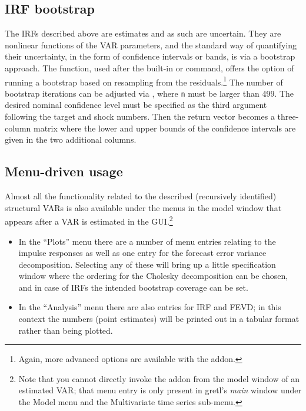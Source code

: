\subsection{IRF bootstrap}

The IRFs described above are estimates and as such are uncertain.  They
are nonlinear functions of the VAR parameters, and the standard way of
quantifying their uncertainty, in the form of confidence intervals or
bands, is via a bootstrap approach. The  function, used after
the built-in  or  command, offers the option of
running a bootstrap based on resampling from the
residuals.\footnote{Again, more advanced options are available with the
   addon.} The number of bootstrap iterations can be adjusted
via , where \texttt{n} must be larger than
499. The desired nominal confidence level must be specified as the third
argument following the target and shock numbers. Then the return vector
becomes a three-column matrix where the lower and upper bounds of the
confidence intervals are given in the two additional columns.

\subsection{Menu-driven usage}

Almost all the functionality related to the described (recursively
identified) structural VARs is also available under the menus in the
model window that appears after a VAR is estimated in the
GUI.\footnote{Note that you cannot directly invoke the  addon
  from the model window of an estimated VAR; that menu entry is only
  present in gretl's \emph{main} window under the Model menu and the
  Multivariate time series sub-menu.}

\begin{itemize}
\item In the ``Plots'' menu there are a number of menu entries relating
  to the impulse responses as well as one entry for the forecast error
  variance decomposition.  Selecting any of these will bring up a little
  specification window where the ordering for the Cholesky decomposition
  can be chosen, and in case of IRFs the intended bootstrap coverage
  can be set.
\item In the ``Analysis'' menu there are also entries for IRF and FEVD;
  in this context the numbers (point estimates) will be printed out in a
  tabular format rather than being plotted.
\end{itemize}


